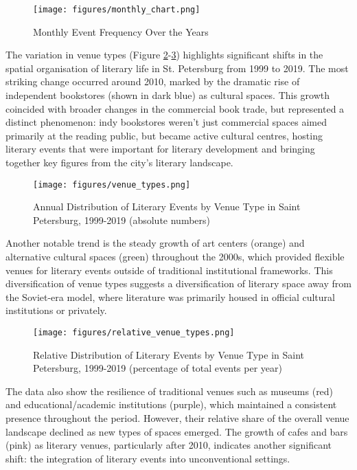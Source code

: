 \documentclass{jcls}
\begin{document}
\begin{figure}
	\texttt{[image: figures/monthly\_chart.png]}
	\caption{Monthly Event Frequency Over the Years}
    \label{monthly}
\end{figure}

The variation in venue types (Figure \ref{absolute}-\ref{relative}) highlights significant shifts in the spatial organisation of literary life in St. Petersburg from 1999 to 2019. The most striking change occurred around 2010, marked by the dramatic rise of independent bookstores (shown in dark blue) as cultural spaces. This growth coincided with broader changes in the commercial book trade, but represented a distinct phenomenon: indy bookstores weren't just commercial spaces aimed primarily at the reading public, but became active cultural centres, hosting literary events that were important for literary development and bringing together key figures from the city's literary landscape.

\begin{figure}
	\texttt{[image: figures/venue\_types.png]}
	\caption{Annual Distribution of Literary Events by Venue Type in Saint Petersburg, 1999-2019 (absolute numbers)}
    \label{absolute}
\end{figure}

Another notable trend is the steady growth of art centers (orange) and alternative cultural spaces (green) throughout the 2000s, which provided flexible venues for literary events outside of traditional institutional frameworks. This diversification of venue types suggests a diversification of literary space away from the Soviet-era model, where literature was primarily housed in official cultural institutions or privately.


\begin{figure}
	\texttt{[image: figures/relative\_venue\_types.png]}
	\caption{Relative Distribution of Literary Events by Venue Type in Saint Petersburg, 1999-2019 (percentage of total events per year)}
    \label{relative}
\end{figure}

The data also show the resilience of traditional venues such as museums (red) and educational/academic institutions (purple), which maintained a consistent presence throughout the period. However, their relative share of the overall venue landscape declined as new types of spaces emerged. The growth of cafes and bars (pink) as literary venues, particularly after 2010, indicates another significant shift: the integration of literary events into unconventional settings.
\end{document}
